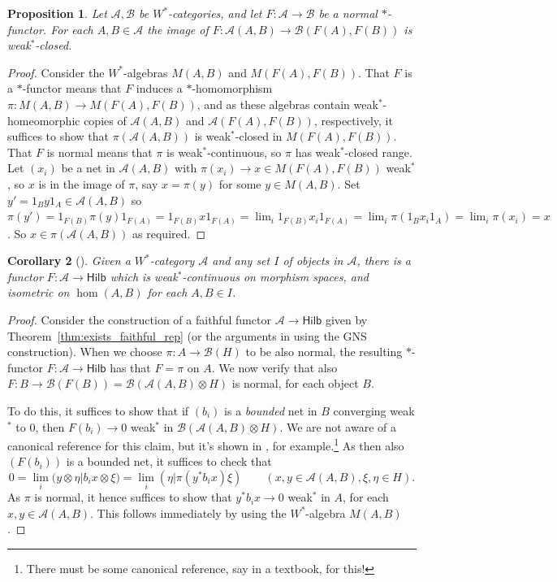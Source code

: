 \documentclass[a4paper,11pt]{article}
\theoremstyle{plain}
\newtheorem{proposition}{Proposition}[section]
\newtheorem{corollary}[proposition]{Corollary}
\theoremstyle{remark}
\newcommand{\mc}[1]{\mathcal{#1}}
\newcommand{\catHilb}{\textsf{Hilb}}
\begin{document}
\begin{proposition}\label{prop:normal_functor_all_wsclosed}
Let $\mc A, \mc B$ be $W^*$-categories, and let $F\colon\mc A\to\mc B$ be a normal $*$-functor.  For each $A,B\in \mc A$ the image of $F \colon \mc A(A,B) \to \mc B(F(A), F(B))$ is weak$^*$-closed.
\end{proposition}
\begin{proof}
Consider the $W^*$-algebras $M(A,B)$ and $M(F(A), F(B))$.  That $F$ is a $*$-functor means that $F$ induces a $*$-homomorphism $\pi \colon M(A,B) \to M(F(A), F(B))$, and as these algebras contain weak$^*$-homeomorphic copies of $\mc A(A,B)$ and $\mc A(F(A), F(B))$, respectively, it suffices to show that $\pi(\mc A(A,B))$ is weak$^*$-closed in $M(F(A), F(B))$.  That $F$ is normal means that $\pi$ is weak$^*$-continuous, so $\pi$ has weak$^*$-closed range.  Let $(x_i)$ be a net in $\mc A(A,B)$ with $\pi(x_i) \to x \in M(F(A), F(B))$ weak$^*$, so $x$ is in the image of $\pi$, say $x = \pi(y)$ for some $y\in M(A,B)$.  Set $y' = 1_B y 1_A \in \mc A(A,B)$ so $\pi(y') = 1_{F(B)} \pi(y) 1_{F(A)} = 1_{F(B)} x 1_{F(A)} = \lim_i 1_{F(B)} x_i 1_{F(A)} = \lim_i \pi( 1_B x_i 1_A) = \lim_i \pi(x_i) = x$.  So $x\in\pi(\mc A(A,B))$ as required.
\end{proof}

\begin{corollary}[{\cite[Proposition~2.13]{GLR_Wstar_categories}}]\label{prop:func_to_Hilb}
Given a $W^*$-category $\mc A$ and any set $I$ of objects in $\mc A$, there is a functor $F \colon \mc A \to \catHilb$ which is weak$^*$-continuous on morphism spaces, and isometric on $\hom(A,B)$ for each $A,B\in I$.
\end{corollary}
\begin{proof}
Consider the construction of a faithful functor $\mc A \to \catHilb$ given by Theorem~\ref{thm:exists_faithful_rep} (or the arguments in \cite{GLR_Wstar_categories,mitchener_cstar_cats} using the GNS construction).  When we choose $\pi \colon A \to \mc B(H)$ to be also normal, the resulting $*$-functor $F\colon\mc A \to \catHilb$ has that $F = \pi$ on $A$.  We now verify that also $F \colon B \to \mc B(F(B)) = \mc B(\mc A(A,B)\otimes H)$ is normal, for each object $B$.

To do this, it suffices to show that if $(b_i)$ is a \emph{bounded} net in $B$ converging weak$^*$ to $0$, then $F(b_i) \to 0$ weak$^*$ in $\mc B(\mc A(A,B)\otimes H)$.  We are not aware of a canonical reference for this claim, but it's shown in \cite[Section~10]{Daws_multipliers}, for example.\footnote{There must be some canonical reference, say in a textbook, for this!}
As then also $(F(b_i))$ is a bounded net, it suffices to check that
\[ 0 = \lim_i \bigl( y\otimes\eta \big| b_ix\otimes\xi \bigr)
= \lim_i (\eta|\pi(y^*b_ix)\xi) \qquad (x,y\in\mc A(A,B), \xi,\eta\in H). \]
As $\pi$ is normal, it hence suffices to show that $y^* b_i x \to 0$ weak$^*$ in $A$, for each $x,y\in\mc A(A,B)$.  This follows immediately by using the $W^*$-algebra $M(A,B)$.
\end{proof}
\end{document}
